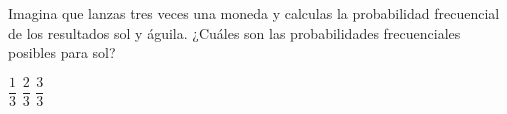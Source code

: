 Imagina que lanzas tres veces una moneda y calculas la probabilidad frecuencial de los resultados sol y águila.
¿Cuáles son las probabilidades frecuenciales posibles para sol?

\begin{oneparcheckboxes}
    \CorrectChoice $\dfrac{1}{3}$
    \CorrectChoice $\dfrac{2}{3}$
    \CorrectChoice $\dfrac{3}{3}$
\end{oneparcheckboxes}